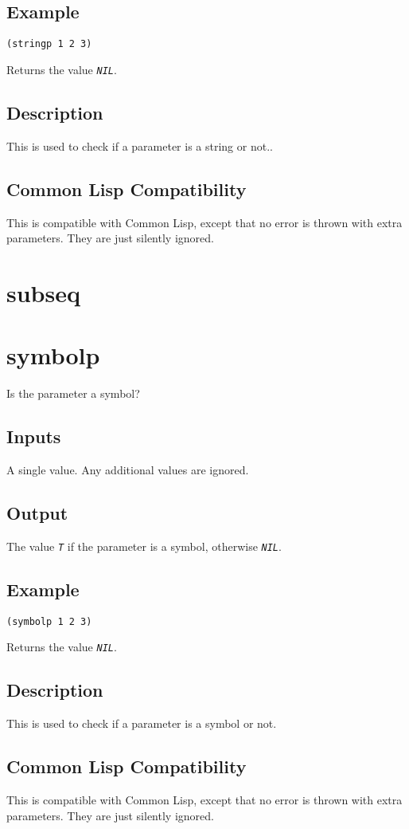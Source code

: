 \documentclass[10pt, openany]{book}
\newcommand{\constant}[1]{\emph{\texttt{#1}}}
\newcommand{\cl}{Common Lisp}
\begin{document}
\subsection{Example}
\begin{lstlisting}
(stringp 1 2 3)
\end{lstlisting}
Returns the value \constant{NIL}.
\subsection{Description}
This is used to check if a parameter is a string or not..
\subsection{Common Lisp Compatibility}
This is compatible with \cl, except that no error is thrown with extra parameters.  They are just silently ignored.

\section{subseq}

\section{symbolp}
Is the parameter a symbol?
\subsection{Inputs}
A single value.  Any additional values are ignored.
\subsection{Output}
The value \constant{T} if the parameter is a symbol, otherwise \constant{NIL}.
\subsection{Example}
\begin{lstlisting}
(symbolp 1 2 3)
\end{lstlisting}
Returns the value \constant{NIL}.
\subsection{Description}
This is used to check if a parameter is a symbol or not.
\subsection{Common Lisp Compatibility}
This is compatible with \cl, except that no error is thrown with extra parameters.  They are just silently ignored.
\end{document}
